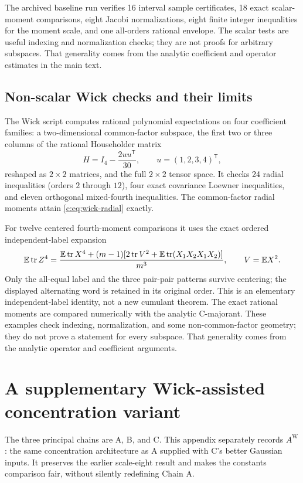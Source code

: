 \documentclass[11pt]{article}
\numberwithin{equation}{section}
\theoremstyle{definition}\newtheorem{definition}[theorem]{Definition}
\theoremstyle{remark}\newtheorem{remark}[theorem]{Remark}
\newcommand{\tr}{\operatorname{tr}}\newcommand{\Ent}{\operatorname{Ent}}
\begin{document}
The archived baseline run verifies 16 interval sample certificates, 18 exact
scalar-moment comparisons, eight Jacobi normalizations, eight finite integer
inequalities for the moment scale, and one all-orders rational envelope.
The scalar tests are useful indexing and normalization checks; they are not
proofs for arbitrary subspaces. That generality comes from the analytic
coefficient and operator estimates in the main text.

\subsection{Non-scalar Wick checks and their limits}
The Wick script computes rational polynomial expectations on four coefficient
families: a two-dimensional common-factor subspace, the first two or three
columns of the rational Householder matrix
\[
 H=I_4-\frac{2uu^{\mathsf T}}{30},\qquad u=(1,2,3,4)^{\mathsf T},
\]
reshaped as $2\times2$ matrices, and the full $2\times2$ tensor space.
It checks 24 radial inequalities (orders $2$ through $12$), four exact
covariance Loewner inequalities, and eleven orthogonal mixed-fourth inequalities.
The common-factor radial moments attain \eqref{c:eq:wick-radial} exactly.

For twelve centered fourth-moment comparisons it uses the exact ordered
independent-label expansion
\[
 \E\tr Z^4=
 \frac{\E\tr X^4+(m-1)[2\tr V^2+\E\tr(X_1X_2X_1X_2)]}{m^3},
 \qquad V=\E X^2.
\]
Only the all-equal label and the three pair-pair patterns survive centering;
the displayed alternating word is retained in its original order. This is an
elementary independent-label identity, not a new cumulant theorem. The exact
rational moments are compared numerically with the analytic C-majorant.
These examples check indexing, normalization, and some non-common-factor
geometry; they do not prove a statement for every subspace. That generality
comes from the analytic operator and coefficient arguments.

\clearpage
\section{A supplementary Wick-assisted concentration variant}\label{app:A-wick}
\begin{takeaway}[title={Not a fourth main chain and not the meaning of Chain C}]
The three principal chains are A, B, and C. This appendix separately records
$A^{\mathrm W}$: the same concentration architecture as A supplied with C's
better Gaussian inputs. It preserves the earlier scale-eight result and makes
the constants comparison fair, without silently redefining Chain A.
\end{takeaway}
\end{document}
